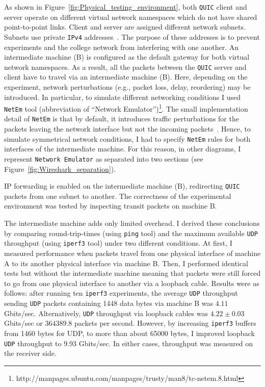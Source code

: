 \documentclass[12pt,a4paper]{report}
\begin{document}
    As shown in Figure~\ref{fig:Physical_testing_environment}, both \texttt{QUIC} client and server operate on different virtual network namespaces which do not have shared point-to-point links.
    Client and server are assigned different network subnets.
    Subnets use private \texttt{IPv4} addresses~\cite{rfc1918}.
    The purpose of these addresses is to prevent experiments and the college network from interfering with one another.
    An intermediate machine (B) is configured as the default gateway for both virtual network namespaces.
    As a result, all the packets between the \texttt{QUIC} server and client have to travel via an intermediate machine (B).
    Here, depending on the experiment, network perturbations (e.g., packet loss, delay, reordering) may be introduced.
    In particular, to simulate different networking conditions I used \texttt{NetEm} tool (abbreviation of \enquote{Network Emulator})\footnote{http://manpages.ubuntu.com/manpages/trusty/man8/tc-netem.8.html}.
    The small implementation detail of \texttt{NetEm} is that by default, it introduces traffic perturbations for the packets leaving the network interface but not the incoming packets~\cite{Ubuntu_Manpage_NetEm}.
    Hence, to simulate symmetrical network conditions, I had to specify \texttt{NetEm} rules for both interfaces of the intermediate machine.
    For this reason, in other diagrams, I represent \texttt{Network Emulator} as separated into two sections (see Figure~\ref{fig:Wireshark_separation}).
    
    
    IP forwarding is enabled on the intermediate machine (B), redirecting \texttt{QUIC} packets from one subnet to another.
    The correctness of the experimental environment was tested by inspecting transit packets on machine B.



    The intermediate machine adds only limited overhead.
    I derived these conclusions by comparing round-trip-times (using \texttt{ping} tool) and the maximum available \texttt{UDP} throughput (using \texttt{iperf3} tool) under two different conditions.
    At first, I measured performance when packets travel from one physical interface of machine A to its another physical interface via machine B.
    Then, I performed identical tests but without the intermediate machine meaning that packets were still forced to go from one physical interface to another via a loopback cable.
    Results were as follows: after running ten \texttt{iperf3} experiments, the average \texttt{UDP} throughput sending \texttt{UDP} packets containing 1448 data bytes via machine B was $4.11$ Gbits/sec.
    Alternatively, \texttt{UDP} throughput via loopback cables was $4.22 \pm 0.03$ Gbits/sec or $364389.8$ packets per second.
    However, by increasing \texttt{iperf3} buffers from 1460 bytes for UDP, to more than about 65000 bytes, I improved loopback \texttt{UDP} throughput to 9.93 Gbits/sec.
    In either cases, throughput was measured on the receiver side.
    
\end{document}
